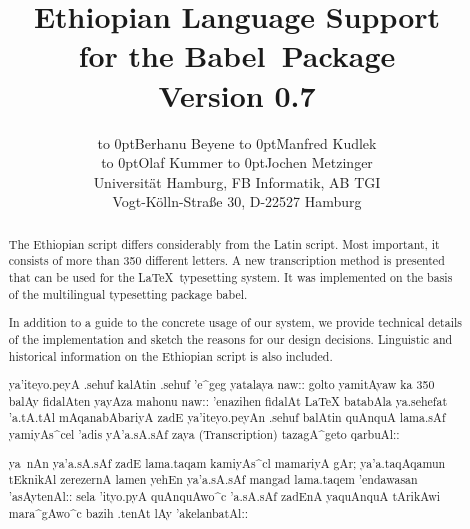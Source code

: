 \documentclass[a4paper]{article}
\newcommand*\babel{\textsf{babel}}
\newcommand*\Babel{\textsf{Babel}}
\begin{document}

\title{\bf
  Ethiopian Language Support\\
  for the \Babel\ Package\\
  {\large Version 0.7}}
\author{
  \hfill\hbox to 0pt{\hss Berhanu Beyene\hss}\hfill
  \hfill\hbox to 0pt{\hss Manfred Kudlek\hss}\hfill\kern0pt\\
  \hfill\hbox to 0pt{\hss Olaf Kummer\hss}\hfill
  \hfill\hbox to 0pt{\hss Jochen Metzinger\hss}\hfill\kern0pt\\[\medskipamount]
  Universit\"at Hamburg,
  FB Informatik,
  AB TGI\\
  Vogt-K\"olln-Stra\ss e 30,
  D-22527 Hamburg}
\maketitle

\begin{abstract}
  The Ethiopian script differs considerably from the Latin script.
  Most important, it consists of more than 350 different letters.
  A new transcription method is presented that can be used for the
  \LaTeX\ typesetting system. It was implemented on the basis
  of the multilingual typesetting package \babel.

  In addition to a guide to the concrete usage of our system, we provide
  technical details of the implementation and sketch the
  reasons for our design decisions. Linguistic and historical
  information on the Ethiopian script is also included.
\end{abstract}
\begin{abstract}
  ya'iteyo.peyA .sehuf kalAtin .sehuf 'e^geg yatalaya naw:: 
  golto yamitAyaw ka 350 balAy fidalAten yayAza mahonu naw:: 
  'enazihen fidalAt 
  \LaTeX{}
  batabAla ya.sehefat 'a.tA.tAl mAqanabAbariyA zadE ya'iteyo.peyAn 
  .sehuf balAtin
  quAnquA lama.sAf
  yamiyAs^cel 'adis yA'a.sA.sAf zaya 
  (Transcription) 
  tazagA^geto qarbuAl::

  ya~nAn ya'a.sA.sAf zadE lama.taqam kamiyAs^cl 
  mamariyA gAr; ya'a.taqAqamun tEknikAl zerezernA lamen yehEn 
  ya'a.sA.sAf mangad lama.taqem 'endawasan 'asAytenAl:: sela 
  'ityo.pyA quAnquAwo^c 'a.sA.sAf zadEnA yaquAnquA tArikAwi 
  mara^gAwo^c bazih .tenAt lAy 'akelanbatAl::
\end{abstract}

\clearpage
\end{document}
